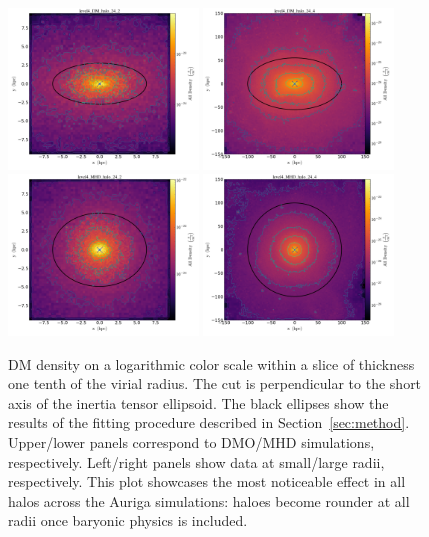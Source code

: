 \documentclass[usenatbib]{mnras}
\begin{document}
\begin{figure}
\includegraphics[width=0.45\textwidth]{level4_DM_halo_24_2.png}
\includegraphics[width=0.45\textwidth]{level4_DM_halo_24_4.png}
\includegraphics[width=0.45\textwidth]{level4_MHD_halo_24_2.png}
\includegraphics[width=0.45\textwidth]{level4_MHD_halo_24_4.png}
  \caption{DM density on a logarithmic color scale within a slice of thickness one tenth
    of the virial radius.
    The cut is perpendicular to the short axis of the inertia tensor ellipsoid.
    The black ellipses show the results of the fitting procedure
    described in Section~\ref{sec:method}. 
    Upper/lower panels correspond to DMO/MHD simulations, respectively.
    Left/right panels show data at small/large radii, respectively.
    This plot showcases the most noticeable effect in all halos
    across the Auriga simulations: haloes become rounder at all radii
    once baryonic physics is included.}
\label{fig:slices}
\end{figure}
\end{document}
